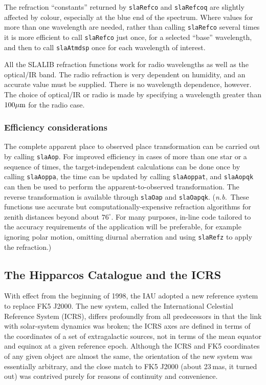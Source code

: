\documentclass[11pt,fleqn,twoside]{article}
\renewcommand{\_}{{\tt\char'137}}     %
\begin{document}
The refraction ``constants'' returned by
{\tt slaRefco} and
{\tt slaRefcoq}
are slightly affected by colour, especially at the blue end
of the spectrum.  Where values for more than one
wavelength are needed, rather than calling
{\tt slaRefco}
several times it is more efficient to call
{\tt slaRefco}
just once, for a selected ``base'' wavelength, and then to call
{\tt slaAtmdsp}
once for each wavelength of interest.
 
All the SLALIB refraction functions work for radio wavelengths as well
as the optical/IR band.  The radio refraction is very dependent on
humidity, and an accurate value must be supplied.  There is no
wavelength dependence, however.  The choice of optical/IR or
radio is made by specifying a wavelength greater than $100\mu {\rm m}$
for the radio case.

\subsubsection{Efficiency considerations}
The complete apparent place to observed place transformation
can be carried out by calling
{\tt slaAop}.
For improved efficiency
in cases of more than one star or a sequence of times, the
target-independent calculations can be done once by
calling
{\tt slaAoppa},
the time can be updated by calling
{\tt slaAoppat},
and
{\tt slaAopqk}
can then be used to perform the
apparent-to-observed transformation.  The reverse transformation
is available through
{\tt slaOap}
and
{\tt slaOapqk}.
({\it n.b.}\ These functions use accurate but computationally-expensive
refraction algorithms for zenith distances beyond about $76^\circ$.
For many purposes, in-line code tailored to the accuracy requirements
of the application will be preferable, for example ignoring polar motion,
omitting diurnal aberration and using
{\tt slaRefz}
to apply the refraction.)

\subsection{The Hipparcos Catalogue and the ICRS}
\label{hipicrs}
With effect from the beginning of 1998, the IAU adopted a new
reference system to replace FK5 J2000.  The new system, called the
International Celestial Reference System (ICRS), differs profoundly
from all predecessors in that the link with solar-system dynamics
was broken;  the ICRS axes are defined in terms of the coordinates
of a set of extragalactic sources, not in terms of the mean equator and
equinox at a given reference epoch.  Although the ICRS and FK5 coordinates
of any given object are almost the same, the orientation of the new system
was essentially arbitrary, and the close match to FK5 J2000
(about 23\,mas, it turned out) was contrived
purely for reasons of continuity and convenience.
 
\end{document}
